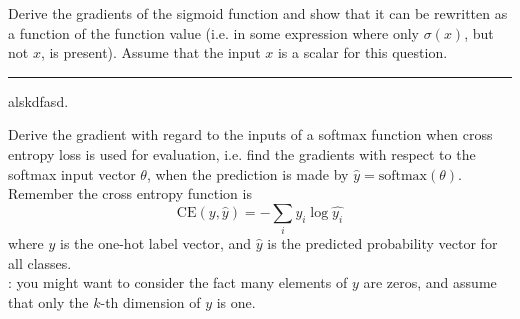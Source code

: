 
\bigskip

\noindent Derive the gradients of the sigmoid function and show that it can be rewritten as a function of the 
function value (i.e. in some expression where only $\sigma(x)$, but not $x$, is present). Assume that the input
$x$ is a scalar for this question.

\noindent\rule{\textwidth}{0.4pt}
 
\noindent alskdfasd.
 
\clearpage
\pagestyle{myheadings}

\bigskip

\noindent Derive the gradient with regard to the inputs of a softmax function when cross entropy loss is used for
evaluation, i.e. find the gradients with respect to the softmax input vector $\theta$, when the prediction is
made by $\hat{y} = \textrm{softmax}(\theta)$. Remember the cross entropy function is
\begin{equation}
\textrm{CE}(y,\hat{y}) = -\sum_{i}{y_{i}\log{\hat{y_{i}}}}
\end{equation}
where $y$ is the one-hot label vector, and $\hat{y}$ is the predicted probability vector for all classes. \vspace{2mm}\\
: you might want to consider the fact many elements of $y$ are zeros, and assume that only the $k$-th dimension
of $y$ is one.

\clearpage

\bigskip

